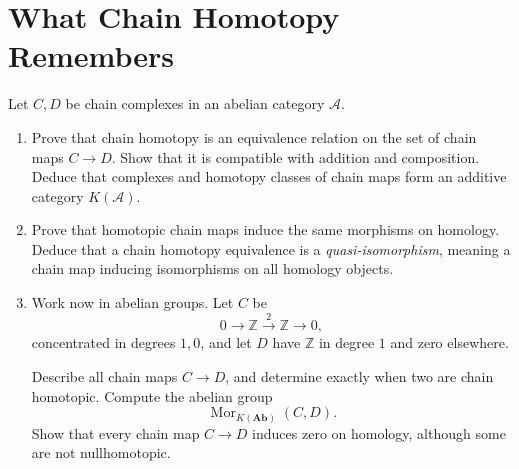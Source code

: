 \documentclass[11pt]{article}
\DeclareMathOperator{\Mor}{Mor}
\newcommand{\Z}{\mathbb{Z}}
\begin{document}
\section{What Chain Homotopy Remembers}
Let \(C,D\) be chain complexes in an abelian category \(\mathcal A\).
\begin{enumerate}
\item Prove that chain homotopy is an equivalence relation on the set of
chain maps \(C\to D\). Show that it is compatible with addition and
composition. Deduce that complexes and homotopy classes of chain maps
form an additive category \(K(\mathcal A)\).

\item Prove that homotopic chain maps induce the same morphisms on
homology. Deduce that a chain homotopy equivalence is a
\emph{quasi-isomorphism}, meaning a chain map inducing isomorphisms on
all homology objects.

\item Work now in abelian groups. Let \(C\) be
\[
0\longrightarrow\Z\xrightarrow{\,2\,}\Z\longrightarrow0,
\]
concentrated in degrees \(1,0\), and let \(D\) have \(\Z\) in degree
\(1\) and zero elsewhere.

Describe all chain maps \(C\to D\), and determine exactly when two are
chain homotopic. Compute the abelian group
\[
\Mor_{K(\mathbf{Ab})}(C,D).
\]
Show that every chain map \(C\to D\) induces zero on homology, although
some are not nullhomotopic.
\end{enumerate}
\end{document}

